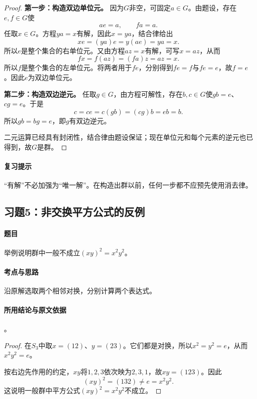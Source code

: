 \begin{proof}
\textbf{第一步：构造双边单位元。}
因为$G$非空，可固定$a\in G$。由题设，存在$e,f\in G$使
\[
ae=a,\qquad fa=a.
\]
任取$x\in G$。方程$ya=x$有解，因此$x=ya$，结合律给出
\[
xe=(ya)e=y(ae)=ya=x.
\]
所以$e$是整个集合的右单位元。又由方程$az=x$有解，可写$x=az$，从而
\[
fx=f(az)=(fa)z=az=x.
\]
所以$f$是整个集合的左单位元。将两者用于$fe$，分别得到$fe=f$与$fe=e$，故$f=e$。因此$e$为双边单位元。

\textbf{第二步：构造双边逆元。}
任取$g\in G$，由方程可解性，存在$b,c\in G$使$gb=e$、$cg=e$。于是
\[
c=ce=c(gb)=(cg)b=eb=b.
\]
所以$gb=bg=e$，即$g$有双边逆元。

二元运算已经具有封闭性，结合律由题设保证；现在单位元和每个元素的逆元也已得到，故$G$是群。
\end{proof}

\paragraph{复习提示}
“有解”不必加强为“唯一解”。在构造出群以前，任何一步都不应预先使用消去律。


\subsection{习题5：\texorpdfstring{非交换平方公式的反例}{非交换平方公式的反例}}
\label{ex:1:5}

\paragraph{题目}
举例说明群中一般不成立$(xy)^2=x^2y^2$。

\paragraph{考点与思路}
沿原解选取两个相邻对换，分别计算两个表达式。

\paragraph{所用结论与原文依据}
。


\begin{proof}
在$S_3$中取$x=(12)$、$y=(23)$。它们都是对换，所以$x^2=y^2=e$，从而$x^2y^2=e$。

按右边先作用的约定，$xy$将$1,2,3$依次映为$2,3,1$，故$xy=(123)$。因此
\[
(xy)^2=(132)\ne e=x^2y^2.
\]
这说明一般群中平方公式$(xy)^2=x^2y^2$不成立。
\end{proof}


